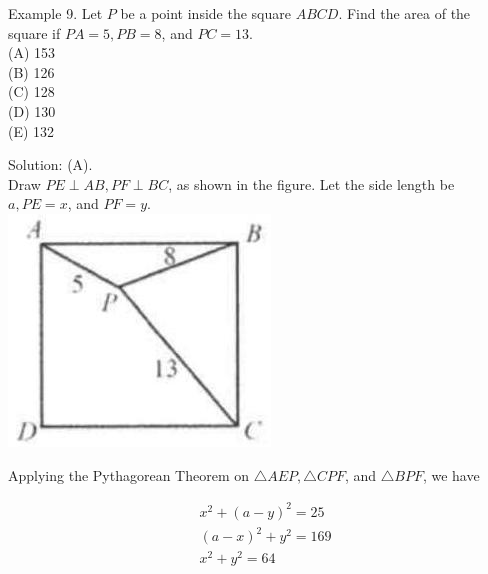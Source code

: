 \documentclass[10pt]{article}
\begin{document}
Example 9. Let \(P\) be a point inside the square \(A B C D\). Find the area of the square if \(P A=5, P B=8\), and \(P C=13\).\\
(A) 153\\
(B) 126\\
(C) 128\\
(D) 130\\
(E) 132

Solution: (A).\\
Draw \(P E \perp A B, P F \perp B C\), as shown in the figure. Let the side length be \(a, P E=x\), and \(P F=y\).\\
\includegraphics[max width=\textwidth, center]{2025_04_17_97bc1f7e44d93c271a88g-080(1)}

Applying the Pythagorean Theorem on \(\triangle A E P, \triangle C P F\), and \(\triangle B P F\), we have

\[
\begin{aligned}
& x^{2}+(a-y)^{2}=25 \\
& (a-x)^{2}+y^{2}=169 \\
& x^{2}+y^{2}=64
\end{aligned}
\]
\end{document}
